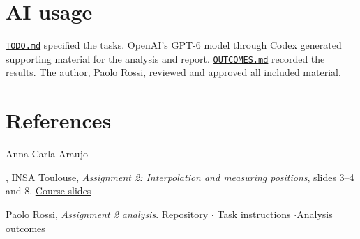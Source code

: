 \documentclass[10pt,a4paper]{article}
\newcommand{\assignmenturl}{https://github.com/massma-students-material/assignment-02-paolo}
\newcommand{\repofile}[2]{\href{\assignmenturl/blob/79d9096c0ea39a8f55ba3f66c3150e4b9892b94f/#1}{#2}}
\newcommand{\authorprofile}{\href{https://github.com/PaoloRos}{Paolo Rossi}}
\begin{document}
\section*{AI usage}
\hyperlink{tasks}{\texttt{TODO.md}} specified the tasks. OpenAI's GPT-6 model through Codex generated
supporting material for the analysis and report. \hyperlink{outcomes}{\texttt{OUTCOMES.md}} recorded the
results. The author, \authorprofile, reviewed and approved all included material.

\section*{References}
{\small
\hypertarget{slides}{Anna Carla Araujo}, INSA Toulouse, \emph{Assignment 2: Interpolation and measuring
positions}, slides 3--4 and 8.
\repofile{assets/Assignment\%202\%20-\%20Slides.pdf}{Course slides}\par
Paolo Rossi, \emph{Assignment 2 analysis}.
\href{\assignmenturl}{Repository} \enspace$\cdot$\enspace
\hypertarget{tasks}{\repofile{TODO.md}{Task instructions}} \enspace$\cdot$\enspace \hypertarget{outcomes}{\repofile{OUTCOMES.md}{Analysis outcomes}}
}
\end{document}
